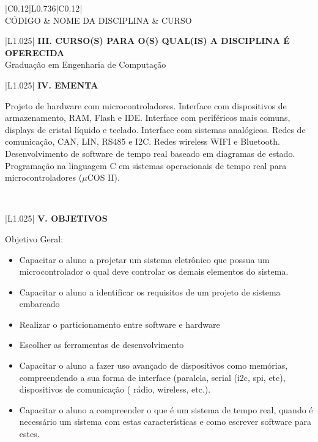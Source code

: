 \documentclass[12pt]{article}
\newcommand{\requisitoA}{}
\newcommand{\requisitoB}{}
\newcommand{\requisitoC}{}
\newcommand{\cursoA}{Graduação em Engenharia de Computação \\ \hline}
\newcommand{\cursoB}{}%
\newcommand{\cursoC}{}
\newcommand{\ementa}{
Projeto de hardware com microcontroladores. Interface com dispositivos de armazenamento, RAM, Flash e IDE. Interface com periféricos mais comuns, displays de cristal líquido e teclado. Interface com sistemas analógicos. Redes de comunicação, CAN, LIN, RS485 e I2C. Redes wireless WIFI e Bluetooth. Desenvolvimento de software de tempo real baseado em diagramas de estado. Programação na linguagem C em sistemas operacionais de tempo real para microcontroladores ($\mu$COS II).

\\ \hline
}
\begin{document}
\begin{longtable}{|C{0.12\textwidth}|L{0.736\textwidth}|C{0.12\textwidth}|} \hline
%
 \\ \hline
%
CÓDIGO & NOME DA DISCIPLINA & CURSO \\ \hline	
%
\requisitoA
\requisitoB
\requisitoC
\end{longtable}


\begin{longtable}{|L{1.025\textwidth}|} \hline
%
{\bf III. CURSO(S) PARA O(S) QUAL(IS) A DISCIPLINA É OFERECIDA } \\ \hline
%
\cursoA 
\cursoB
\cursoC

\end{longtable}

\begin{longtable}{|L{1.025\textwidth}|} \hline
%
{\bf IV. EMENTA } \\ \hline
%
\ementa
\end{longtable}

\newpage



\begin{longtable}{|L{1.025\textwidth}|} \hline
%
{\bf V. OBJETIVOS } \\ \hline

Objetivo Geral: 
\begin{itemize}
\item Capacitar o aluno a projetar um sistema eletrônico que possua um microcontrolador o qual deve controlar os demais elementos do sistema.
\item  Capacitar o aluno a identificar os requisitos de um projeto de sistema embarcado
\item Realizar o particionamento entre software e hardware
\item Escolher as ferramentas de desenvolvimento
\item Capacitar o aluno a fazer uso avançado de dispositivos como memórias, compreendendo a sua forma de interface (paralela, serial (i2c, spi, etc), dispositivos de comunicação ( rádio, wireless, etc.). 
\item Capacitar o aluno a compreender o que é um sistema de tempo real, quando é necessário um sistema com estas características e como escrever software para estes.
\end{itemize}
\\ \hline
\end{longtable}
\end{document}
